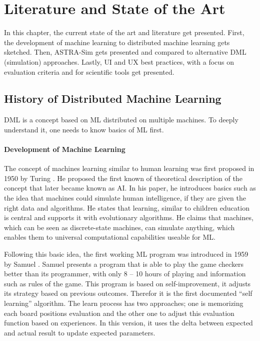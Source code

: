 
\chapter{Literature and State of the Art} %
\label{chap:literature}
In this chapter, the current state of the art and literature get presented.
First, the development of machine learning to distributed machine learning gets sketched. Then, \ac{ASTRA-Sim} gets presented and compared to alternative \ac{DML} (simulation) approaches.
Lastly, \ac{UI} and \ac{UX} best practices, with a focus on evaluation criteria and  for scientific tools get presented. 

\section{History of Distributed Machine Learning}
\ac{DML} is a concept based on \ac{ML} distributed on multiple machines. To deeply understand it, one needs to know basics of \ac{ML} first.

\subsubsection*{Development of Machine Learning}
The concept of machines learning similar to human learning was first proposed in 1950 by Turing \cite{turing_computing_1989}. He proposed the first known of theoretical description of the concept that later became known as \ac{AI}.
In his paper, he introduces basics such as the idea that machines could simulate human intelligence, if they are given the right data and algorithms. He states that learning, similar to children education is central and supports it with evolutionary algorithms. He claims that machines, which can be seen as discrete-state machines, can simulate anything, which enables them to universal computational capabilities useable for \ac{ML}.

Following this basic idea, the first working \ac{ML} program was introduced in 1959 by Samuel \cite{samuel_studies_1959}. Samuel presents a program that is able to play the game checkers better than its programmer, with only 8 -- 10 hours of playing and information such as rules of the game. This program is based on self-improvement, it adjusts its strategy based on previous outcomes. Therefor it is the first documented ``self learning'' algorithm. The learn process has two approaches; one is memorizing each board positions evaluation and the other one to adjust this evaluation function based on experiences.  In this version, it uses the delta between expected and actual result to update expected parameters.

